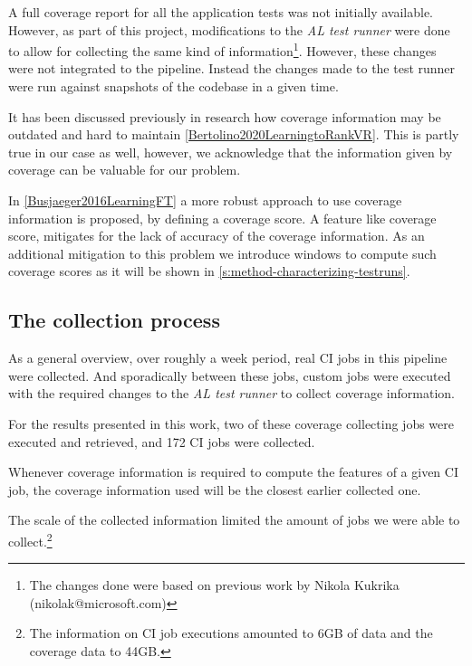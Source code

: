 A full coverage report for all the application tests was not initially available. However, as 
part of this project, modifications to the \emph{AL test runner} were done to allow 
for collecting the same kind of information\footnote{The changes done were based on 
previous work by Nikola Kukrika (nikolak@microsoft.com)}. However, these changes were not 
integrated to the pipeline. Instead the changes made to the test runner were run against snapshots of 
the codebase in a given time.

It has been discussed previously in research how coverage information may be
outdated and hard to maintain \ref{Bertolino2020LearningtoRankVR}. This is 
partly true in our case as well, however, we acknowledge that the information 
given by coverage can be valuable for our problem.

In \ref{Busjaeger2016LearningFT} a more robust approach to use coverage information is proposed, by defining
a coverage score. A feature like coverage score, mitigates for the lack of accuracy 
of the coverage information. As an additional mitigation to this problem we introduce
windows to compute such coverage scores as it will be shown in \ref{s:method-characterizing-testruns}.

\subsection{The collection process}

As a general overview, over roughly a week period, real CI jobs in this pipeline were collected. And 
sporadically between these jobs, custom jobs were executed with the required changes
to the \emph{AL test runner} to collect coverage information. 

For the results presented in this work, two of these coverage collecting jobs were 
executed and retrieved, and 172 CI jobs were collected.

Whenever coverage information is required to compute the features of a given CI job,
the coverage information used will be the closest earlier collected one.

The scale of the collected information limited the amount of jobs we were able to
collect.\footnote{The information on CI job executions amounted to 6GB of data and 
the coverage data to 44GB. }